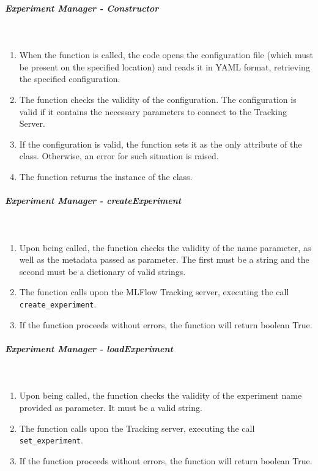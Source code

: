 \subparagraph{Experiment Manager - Constructor} \mbox{}\\

\begin{enumerate}
    \item When the function is called, the code opens the configuration file (which must be present on the specified location) and reads 
    it in YAML format, retrieving the specified configuration.

    \item The function checks the validity of the configuration. The configuration is valid if it contains the necessary parameters to connect 
    to the Tracking Server.

    \item If the configuration is valid, the function sets it as the only attribute of the class. Otherwise, an error for such situation 
    is raised.

    \item The function returns the instance of the class.
\end{enumerate}

\subparagraph{Experiment Manager - createExperiment} \mbox{}\\

\begin{enumerate}
    \item Upon being called, the function checks the validity of the name parameter, as well as the metadata passed as parameter. The first 
    must be a string and the second must be a dictionary of valid strings.

    \item The function calls upon the MLFlow Tracking server, executing the call \texttt{create\_experiment}.

    \item If the function proceeds without errors, the function will return boolean True.
\end{enumerate}

\subparagraph{Experiment Manager - loadExperiment} \mbox{}\\

\begin{enumerate}
    \item Upon being called, the function checks the validity of the experiment name provided as parameter. It must be a valid string.

    \item The function calls upon the Tracking server, executing the call \texttt{set\_experiment}.

    \item If the function proceeds without errors, the function will return boolean True.
\end{enumerate}


